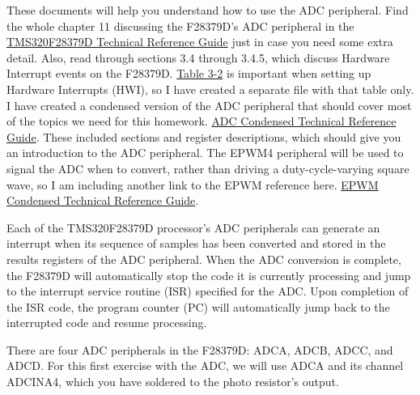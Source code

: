 \documentclass[11pt]{article}
\begin{document}
These documents will help you understand how to use the ADC peripheral. Find the whole chapter 11 discussing the F28379D’s ADC peripheral in the \href{http://coecsl.ece.illinois.edu/se423/tms320f28379D_TechRefi.pdf}{TMS320F28379D Technical Reference Guide} just in case you need some extra detail. Also, read through sections 3.4 through 3.4.5, which discuss Hardware Interrupt events on the F28379D. \href{http://coecsl.ece.illinois.edu/se423/PeripheralInterruptChannelMapTable.pdf}{Table 3-2} is important when setting up Hardware Interrupts (HWI), so I have created a separate file with that table only. I have created a condensed version of the ADC peripheral that should cover most of the topics we need for this homework.
\href{http://coecsl.ece.illinois.edu/se423/ADC_Peripheral.pdf}{ADC Condensed Technical Reference Guide}. These included sections and register descriptions, which should give you an introduction to the ADC peripheral. The EPWM4 peripheral will be used to signal the ADC when to convert, rather than driving a duty-cycle-varying square wave, so I am including another link to the EPWM reference here. \href{http://coecsl.ece.illinois.edu/se423/EPWM_Peripheral.pdf}{EPWM Condensed Technical Reference Guide}.

Each of the TMS320F28379D processor’s ADC peripherals can generate an interrupt when its sequence of samples has been converted and stored in the results registers of the ADC peripheral. When the ADC conversion is complete, the F28379D will automatically stop the code it is currently processing and jump to the interrupt service routine (ISR) specified for the ADC. Upon completion of the ISR code, the program counter (PC) will automatically jump back to the interrupted code and resume processing.

There are four ADC peripherals in the F28379D: ADCA, ADCB, ADCC, and ADCD. For this first exercise with the ADC, we will use ADCA and its channel ADCINA4, which you have soldered to the photo resistor's output.
\end{document}

